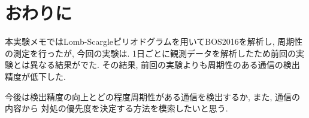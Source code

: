 \documentclass[twocolumn,10pt]{ltjsarticle}
\begin{document}
\section{おわりに}
本実験メモではLomb-Scargleピリオドグラムを用いてBOS2016を解析し, 周期性の測定を行ったが, 
今回の実験は. 1日ごとに観測データを解析したため前回の実験とは異なる結果がでた. 
その結果, 前回の実験よりも周期性のある通信の検出精度が低下した. 

今後は検出精度の向上とどの程度周期性がある通信を検出するか, また, 通信の内容から
対処の優先度を決定する方法を模索したいと思う. 



\end{document}
